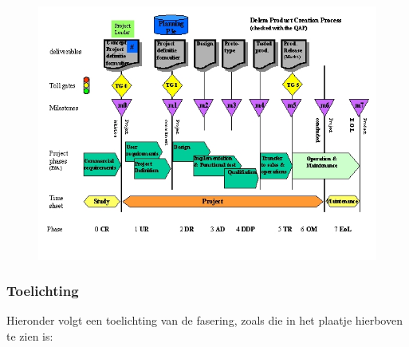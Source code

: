 \label{faseringoverzicht}
\begin{figure}[h]
\includegraphics[width=\textwidth]{proces.jpg}
\end{figure}

\subsubsection{Toelichting}

Hieronder volgt een toelichting van de fasering, zoals die in het plaatje hierboven te zien is:

